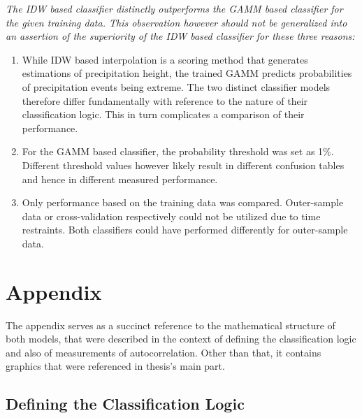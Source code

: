 \documentclass[
  12pt,
]{article}
\begin{document}
\begin{mdframed}[frametitle={Answer to the Research Question}]
\begin{adjustwidth}{0.5cm}{0cm} 
\textit{The IDW based classifier distinctly outperforms the GAMM based classifier for the given training data. This observation however should not be generalized into an assertion of the superiority of the IDW based classifier for these three reasons:}
\begin{enumerate}
\item While IDW based interpolation is a scoring method that generates estimations of precipitation height, the trained GAMM predicts probabilities of precipitation events being extreme. The two distinct classifier models therefore differ fundamentally with reference to the nature of their classification logic. This in turn complicates a comparison of their performance. 
\item For the GAMM based classifier, the probability threshold was set as 1\%. Different threshold values however likely result in different confusion tables and hence in different measured performance. 
\item Only performance based on the training data was compared. Outer-sample data or cross-validation respectively could not be utilized due to time restraints. Both classifiers could have performed differently for outer-sample data.
\end{enumerate}
\end{adjustwidth}
\label{research_question_answer}
\end{mdframed}

\cleardoublepage
{}
\setcounter{page}{\thesavepage}

\hypertarget{appendix}{%
\section{Appendix}\label{appendix}}

The appendix serves as a succinct reference to the mathematical
structure of both models, that were described in the context of defining
the classification logic and also of measurements of autocorrelation.
Other than that, it contains graphics that were referenced in thesis's
main part.

\hypertarget{defining-the-classification-logic}{%
\subsection{Defining the Classification
Logic}\label{defining-the-classification-logic}}
\end{document}
